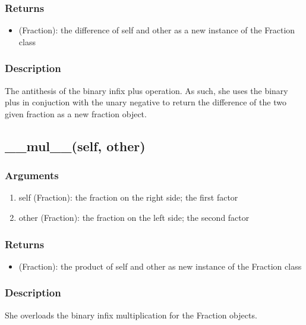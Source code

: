 \documentclass[refman]{scrartcl}
\begin{document}
\subsubsection*{Returns}

\begin{itemize}
	\item (Fraction): the difference of self and other as a new instance of the Fraction class
\end{itemize}

\subsubsection*{Description}

The antithesis of the binary infix plus operation. As such, she uses the binary plus in conjuction with the unary negative to return the difference of the two given fraction as a new fraction object.

\subsection{\_\_mul\_\_(self, other)}

\subsubsection*{Arguments}

\begin{enumerate}
	\item self (Fraction): the fraction on the right side; the first factor
	\item other (Fraction): the fraction on the left side; the second factor
\end{enumerate}

\subsubsection*{Returns}

\begin{itemize}
	\item (Fraction): the product of self and other as new instance of the Fraction class
\end{itemize}

\subsubsection*{Description}

She overloads the binary infix multiplication for the Fraction objects.
\end{document}
